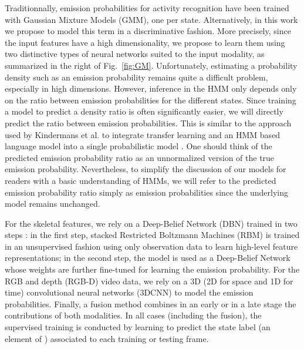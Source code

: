 Traditionnally, emission probabilities for activity recognition have been trained with Gaussian Mixture Models (GMM), one per state.
%
Alternatively, in this work we propose to model this term in a discriminative fashion.
More precisely, since the input features have a high dimensionality,
we propose to learn them using two distinctive types of neural networks suited to the input modality,
as summarized in the right of Fig.~\ref{fig:GM}.
%
Unfortunately, estimating a probability density such as an emission probability remains quite a difficult problem, especially in high dimensions. However, inference in the HMM only depends only on the ratio between emission probabilities for the different states. Since training a model to predict a density ratio is often significantly easier, we will directly predict the ratio between emission probabilities. This is similar to the approach used by Kindermans et al. to integrate transfer learning and an HMM based language model into a single probabilistic model \cite{Kindermans2012a}.
One should think of the predicted emission probability ratio as an unnormalized version of the true emission probability. Nevertheless, to simplify the discussion of our models for readers with a basic understanding of HMMs, we will refer to the predicted emission probability ratio simply as emission probabilities since the underlying model remains unchanged. 

For  the skeletal features, we rely on a Deep-Belief Network (DBN) trained in two steps \cite{salakhutdinov2009learning}:
in the first step,  stacked Restricted Boltzmann Machines (RBM) is trained in an unsupervised fashion using only observation data
to learn  high-level feature representations;
in the second step, the model is used as a Deep-Belief Network whose weights are further fine-tuned
for learning the emission probability.
%
For the RGB and depth (RGB-D) video data, we rely on a 3D (2D for space and 1D for time)
convolutional neural networks (3DCNN) to model the emission probabilities.
%
Finally, a fusion method combines in an early or in a late stage the contributions of both modalities.
%
In all cases (including the fusion), the supervised training is conducted by learning to
predict the state label (an element of \finiteset) associated to each training or testing frame.


